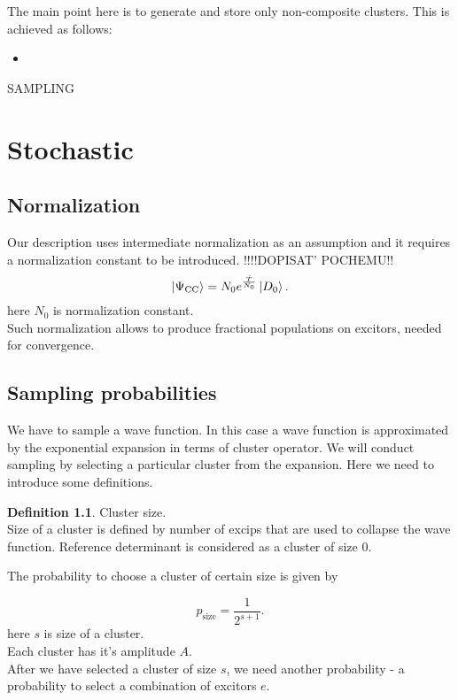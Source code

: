 \documentclass[twoside,english]{uiofysmaster}
\theoremstyle{definition}
\newtheorem{defn}{Definition}
\begin{document}
The main point here is to generate and store only non-composite clusters. This is achieved as follows:
\begin{itemize}
\item 
\end{itemize} 


SAMPLING

















\chapter{Stochastic}
\section{Normalization}
Our description uses intermediate normalization as an assumption and it requires a normalization constant to be introduced. 
!!!!DOPISAT' POCHEMU!!
\begin{equation}
\ket{\Psi_{\text{CC}}}=N_0 e^{\frac{\hat{T}}{N_0}} \ket{D_0}.
\end{equation}
here $N_0$ is normalization constant.\\
Such normalization allows to produce fractional populations on excitors, needed for convergence.
\section{Sampling probabilities}

We have to sample a wave function. In this case a wave function is approximated by the exponential expansion in terms of cluster operator. We will conduct sampling by selecting a particular cluster from the expansion. Here we need to introduce some definitions.\\


\begin{defn}Cluster size.\\
 Size of a cluster is defined by number of excips that are used to collapse the wave function. Reference determinant is considered as a cluster of size $0$.
\end{defn}
The probability to choose a cluster of certain size is given by

\begin{equation}
	p_{\text{size}} = \frac{1}{2^{s+1}}.
\end{equation}
here $s$ is size of a cluster. \\
Each cluster has it's amplitude $A$.\\
After we have selected a cluster of size $s$, we need another probability - a probability to select a combination of excitors $e$.
\end{document}
